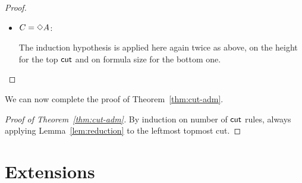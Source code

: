 \documentclass[a4paper]{article}
\begin{document}
\begin{proof}
\begin{description}
\begin{itemize}
The top $\rn{cut}$ is admissible by induction on the height, as the size of the cut-formula is constant. This however may increase the height above the right premiss of the bottom $\rn{cut}$ arbitrarily. The bottom $\rn{cut}$ is still admissible as the size of the cut-formula decreases.

\item $C=\mathord{\Diamond} A$:

\begin{smallequation*}
\end{smallequation*}

\begin{smallequation*}
\end{smallequation*}
%
The induction hypothesis is applied here again twice as above, on the height for the top $\rn{cut}$ and on formula size for the bottom one.
\end{itemize}
\end{description}
\end{proof}


We can now complete the proof of Theorem~\ref{thm:cut-adm}.
\begin{proof}[Proof of Theorem~\ref{thm:cut-adm}]
	By induction on number of $\rn{cut}$ rules, always applying Lemma~\ref{lem:reduction} to the leftmost topmost cut.
\end{proof}
\newcommand{\set}[1]{\{#1\}}

\section{Extensions}\label{sec:ext}
\end{document}

